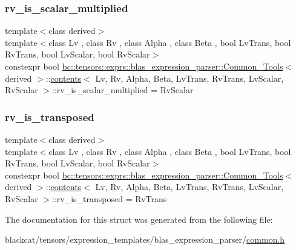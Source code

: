\subsubsection{\texorpdfstring{rv\+\_\+is\+\_\+scalar\+\_\+multiplied}{rv\_is\_scalar\_multiplied}}
{\footnotesize\ttfamily template$<$class derived$>$ \\
template$<$class Lv , class Rv , class Alpha , class Beta , bool Lv\+Trans, bool Rv\+Trans, bool Lv\+Scalar, bool Rv\+Scalar$>$ \\
constexpr bool \hyperlink{structbc_1_1tensors_1_1exprs_1_1blas__expression__parser_1_1Common__Tools}{bc\+::tensors\+::exprs\+::blas\+\_\+expression\+\_\+parser\+::\+Common\+\_\+\+Tools}$<$ derived $>$\+::\hyperlink{structbc_1_1tensors_1_1exprs_1_1blas__expression__parser_1_1Common__Tools_1_1contents}{contents}$<$ Lv, Rv, Alpha, Beta, Lv\+Trans, Rv\+Trans, Lv\+Scalar, Rv\+Scalar $>$\+::rv\+\_\+is\+\_\+scalar\+\_\+multiplied = Rv\+Scalar\hspace{0.3cm}{\ttfamily [static]}}

\mbox{\label{structbc_1_1tensors_1_1exprs_1_1blas__expression__parser_1_1Common__Tools_1_1contents_a51b226f3f78726dec6c1258666413ace}} 
\subsubsection{\texorpdfstring{rv\+\_\+is\+\_\+transposed}{rv\_is\_transposed}}
{\footnotesize\ttfamily template$<$class derived$>$ \\
template$<$class Lv , class Rv , class Alpha , class Beta , bool Lv\+Trans, bool Rv\+Trans, bool Lv\+Scalar, bool Rv\+Scalar$>$ \\
constexpr bool \hyperlink{structbc_1_1tensors_1_1exprs_1_1blas__expression__parser_1_1Common__Tools}{bc\+::tensors\+::exprs\+::blas\+\_\+expression\+\_\+parser\+::\+Common\+\_\+\+Tools}$<$ derived $>$\+::\hyperlink{structbc_1_1tensors_1_1exprs_1_1blas__expression__parser_1_1Common__Tools_1_1contents}{contents}$<$ Lv, Rv, Alpha, Beta, Lv\+Trans, Rv\+Trans, Lv\+Scalar, Rv\+Scalar $>$\+::rv\+\_\+is\+\_\+transposed = Rv\+Trans\hspace{0.3cm}{\ttfamily [static]}}



The documentation for this struct was generated from the following file\+:\begin{DoxyCompactItemize}
\item 
blackcat/tensors/expression\+\_\+templates/blas\+\_\+expression\+\_\+parser/\hyperlink{tensors_2expression__templates_2blas__expression__parser_2common_8h}{common.\+h}\end{DoxyCompactItemize}
